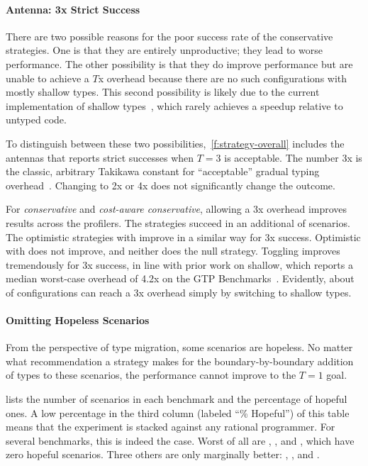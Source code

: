 \paragraph{Antenna: 3x Strict Success} \label{s:antenna}

There are two possible reasons for the poor success rate of the conservative
strategies.
One is that they are entirely unproductive; they lead to worse performance.
The other possibility is that they do improve performance but are unable
to achieve a $T$x overhead because there are no such configurations with
mostly shallow types.
This second possibility is likely due to the current implementation of shallow
types~\cite{g-deep-shallow}, which rarely achieves a speedup relative to untyped
code.

To distinguish between these two possibilities,~\cref{f:strategy-overall} includes the antennas that
reports strict successes when $T = 3$ is acceptable.  The
number 3x is the classic, arbitrary Takikawa constant for ``acceptable'' gradual typing
overhead~\cite{vss-popl-2017,bbst-oopsla-2017}.  Changing to 2x or 4x does not
significantly change the outcome.

For \emph{conservative} and \emph{cost-aware conservative}, allowing a 3x
overhead improves results across the profilers. The strategies succeed in an
additional  of scenarios.  The optimistic strategies with \statkw{}
improve in a similar way for 3x success.  Optimistic with \featkw{} does
not improve, and neither does the null strategy.  Toggling
improves tremendously for 3x success, in line with prior work on shallow, which
reports a median worst-case overhead of 4.2x on the GTP
Benchmarks~\cite{g-deep-shallow}.  Evidently, about  of configurations can
reach a 3x overhead simply by switching to shallow types.

\paragraph{Omitting Hopeless Scenarios} From the perspective of type
migration, some scenarios are hopeless. No matter what recommendation a strategy
makes for the boundary-by-boundary addition of types to these scenarios,
the performance cannot improve to the $T=1$ goal.

 lists the number of scenarios in each benchmark and the
percentage of hopeful ones. A low percentage in the third column (labeled ``\%
Hopeful'') of this table means that the experiment is stacked against any rational
programmer.  For several benchmarks, this is indeed the case.  Worst of all are
, , and , which have zero hopeful
scenarios.  Three others are only marginally better: ,
, and .

